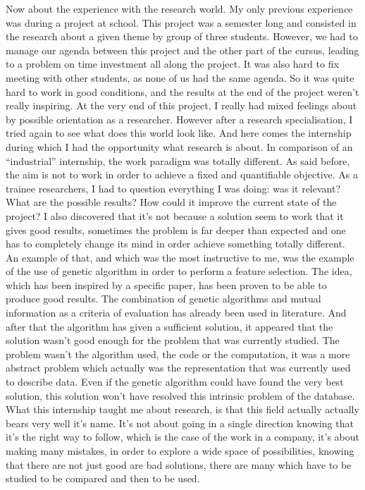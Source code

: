 \documentclass{report}
\begin{document}
		Now about the experience with the research world. My only previous experience was during a project at school. This project was a semester long and consisted in the research about a given theme by group of three students. However, we had to manage our agenda between this project and the other part of the cursus, leading to a problem on time investment all along the project. It was also hard to fix meeting with other students, as none of us had the same agenda. So it was quite hard to work in good conditions, and the results at the end of the project weren't really inspiring. At the very end of this project, I really had mixed feelings about by possible orientation as a researcher. However after a research specialisation, I tried again to see what does this world look like. And here comes the internship during which I had the opportunity what research is about. In comparison of an “industrial” internship, the work paradigm was totally different. As said before, the aim is not to work in order to achieve a fixed and quantifiable objective. As a trainee researchers, I had to question everything I was doing: was it relevant? What are the possible results? How could it improve the current state of the project? I also discovered that it's not because a solution seem to work that it gives good results, sometimes the problem is far deeper than expected and one has to completely change its mind in order achieve something totally different.
		An example of that, and which was the most instructive to me, was the example of the use of genetic algorithm in order to perform a feature selection. The idea, which has been inspired by a specific paper, has been proven to be able to produce good results. The combination of genetic algorithms and mutual information as a criteria of evaluation has already been used in literature. And after that the algorithm has given a sufficient solution, it appeared that the solution wasn't good enough for the problem that was currently studied. The problem wasn't the algorithm used, the code or the computation, it was a more abstract problem which actually was the representation that was currently used to describe data. Even if the genetic algorithm could have found the very best solution, this solution won't have resolved this intrinsic problem of the database.\\
		
		What this internship taught me about research, is that this field actually actually bears very well it's name. It's not about going in a single direction knowing that it's the right way to follow, which is the case of the work in a company, it's about making many mistakes, in order to explore a wide space of possibilities, knowing that there are not just good are bad solutions, there are many which have to be studied to be compared and then to be used.\\
		
\end{document}
